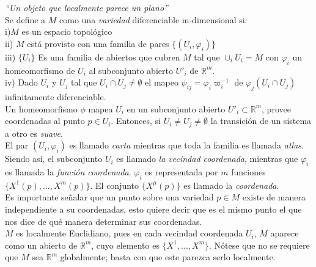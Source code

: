 \documentclass{report}
\begin{document}
\textit{``Un objeto que localmente parece un plano''}\\

Se define a $M$ como una \textit{variedad} diferenciable m-dimensional si:\\

i)$M$ es un espacio topológico\\

ii) $M$ está provisto con una familia de pares $\lbrace (U _{i}, \varphi _{i}) \rbrace$\\

iii) $\lbrace U_{i} \rbrace$ Es una familia de abiertos que cubren $M$ tal que $\cup _{i}  U_{i} = M$ con $\varphi _{i}$ un homeomorfismo de $U_{i}$ al subconjunto abierto $U ' _{i}$ de $\mathbb{R}^{m}$.\\

iv) Dado $U_{i}$ y $U_{j}$ tal que $U_{i} \cap U_{j} \neq \emptyset$ el mapeo $\psi _{ij} = \varphi _{i} \varpi _{i} ^{-1}$ de $\varphi_ {j}(U_{i} \cap U_{j})$ infinitamente diferenciable.\\

Un homeomorfismo $\phi$ mapea $U_{i}$ en un subconjunto abierto $U' _{i} \subset \mathbb{R}^{m}$, provee coordenadas al punto $p \in U_{i}$. Entonces, si $U_{i} \neq U_{j} \neq \emptyset$ la transición de un sistema a otro es \textit{suave}.\\

El par $(U_{i}, \varphi _{i})$ es llamado \textit{carta} mientras que toda la familia es llamada \textit{atlas}. Siendo así, el subconjunto $U_{i}$ es llamado \textit{la vecindad coordenada}, mientras que $\varphi _{i}$ es llamada la \textit{función coordenada}. $\varphi _{i}$ es representada por $m$ funciones $\lbrace X^{1}(p), ..., X^{m}(p) \rbrace$. El conjunto $\lbrace X^{\mu} (p) \rbrace$ es llamado la \textit{coordenada}.\\
Es importante señalar que un punto sobre una variedad $p \in M$ existe de manera independiente a su coordenadas, esto quiere decir que es el mismo punto el que nos dice de qué manera determinar sus coordenadas.\\

$M$ es localmente Euclidiano, pues en cada vecindad coordenada $U_{i}$, $M$ aparece como un abierto de $\mathbb{R}^{m}$, cuyo elemento es $\lbrace X^{1}, ..., X^{m} \rbrace$. Nótese que no se requiere que $M$ sea $\mathbb{R}^{m}$ globalmente; basta con que este parezca serlo localmente.\\
\end{document}
